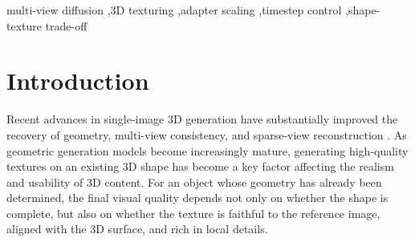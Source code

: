 \documentclass[times,twocolumn,final]{elsarticle}
\begin{document}
\begin{frontmatter}
\begin{abstract}
Multi-view diffusion pipelines for 3D asset texturing commonly inject geometric conditions through adapter modules, but adapter scale is not a universal guidance strength. We study Timestep-Conditioned Adapter Scaling (TCAS) as a training-free, three-stage inference intervention: a low--high--low schedule is selected on a probe set and then evaluated under frozen protocols. On a strict 276-object main-adapter holdout, a clean-v2 four-condition run and a separately labeled stage-placement follow-up show that stage placement changes the output, but no schedule dominates all reported targets. In the follow-up, LHL improves on selected targets relative to fixed mean and HLL, whereas LLH is better than LHL on all six non-SSIM evaluation metrics and on the saved-artifact Full-SSIM branch. A second-backbone audit likewise leaves the pre-specified CAI selection undefined. A 12-object stratified baking case study verifies the end-to-end GLB/unseen-view path but does not establish a population-level 3D advantage. We therefore present TCAS as a bounded, adapter-dependent mechanism study rather than a universal schedule-selection rule.
\end{abstract}

\begin{keyword}
\KWD
multi-view diffusion \sep 3D texturing \sep adapter scaling \sep timestep control \sep shape-texture trade-off
\end{keyword}

\end{frontmatter}

\linenumbers

\section{Introduction}
\label{sec:intro}

Recent advances in single-image 3D generation have substantially improved the recovery of geometry, multi-view consistency, and sparse-view reconstruction \cite{liu2023zero1to3,shi2023zero123pp,liu2023syncdreamer,long2023wonder3d,shi2024mvdream,wang2023imagedream,xu2024instantmesh,ke2024era3d}. As geometric generation models become increasingly mature, generating high-quality textures on an existing 3D shape has become a key factor affecting the realism and usability of 3D content. For an object whose geometry has already been determined, the final visual quality depends not only on whether the shape is complete, but also on whether the texture is faithful to the reference image, aligned with the 3D surface, and rich in local details.
\end{document}
